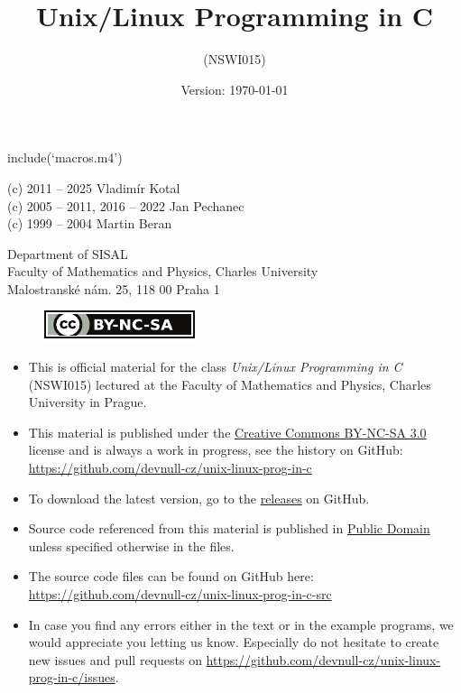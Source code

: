 
include(`macros.m4')

\begin{slide}
\centerslidestrue
\begin{center}
\title{\LARGE Unix/Linux Programming in C}
\author{(NSWI015)}
\date{Version: \rm\today}
\maketitle

\vspace{2ex}
{\small (c) 2011 -- 2025 Vladim\'{i}r Kotal}\\
{\small (c) 2005 -- 2011, 2016 -- 2022 Jan Pechanec}\\
{\small (c) 1999 -- 2004 Martin Beran}

\vspace{2ex}
Department of SISAL\\
Faculty of Mathematics and Physics, Charles University\\
Malostransk\'{e} n\'{a}m. 25, 118 00 Praha 1

\begin{figure}[htb!]
  \includegraphics[scale=0.75]{img/by-nc-sa-small}
\end{figure}
\end{center}
\end{slide}

\begin{itemize}
\item This is official material for the class \emph{Unix/Linux Programming in C}
(NSWI015) lectured at the Faculty of Mathematics and Physics, Charles University
in Prague.
\item This material is published under the
\href{http://creativecommons.org/licenses/by-nc-sa/3.0/cz/}{Creative Commons
BY-NC-SA 3.0} license and is always a work in progress, see the history on
GitHub:\\
\url{https://github.com/devnull-cz/unix-linux-prog-in-c}
\item To download the latest version, go to the
\href{https://github.com/devnull-cz/unix-linux-prog-in-c/releases}{releases}
on GitHub.
\item Source code referenced from this material is published in
\href{http://creativecommons.org/licenses/publicdomain/}{Public Domain} unless
specified otherwise in the files.
\item The source code files can be found on GitHub here:\\
\url{https://github.com/devnull-cz/unix-linux-prog-in-c-src}
\item In case you find any errors either in the text or in the example programs,
we would appreciate you letting us know. Especially do not hesitate to create new
issues and pull requests on \url{https://github.com/devnull-cz/unix-linux-prog-in-c/issues}.
\end{itemize}

